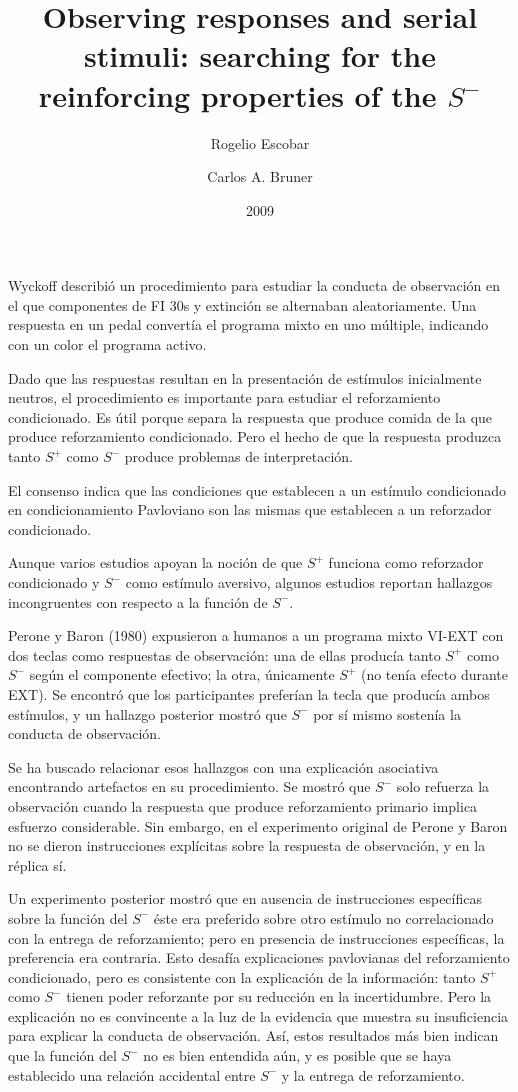 \documentclass[a4paper,12pt]{article}
\title{Observing responses and serial stimuli: searching for the reinforcing properties of the $S^{-}$}
\author{Rogelio Escobar \and Carlos A. Bruner}
\date{2009}
\begin{document}
{\scshape\bfseries \maketitle}

Wyckoff describió un procedimiento para estudiar la conducta de observación en el que componentes de FI 30s y extinción se alternaban aleatoriamente.
Una respuesta en un pedal convertía el programa mixto en uno múltiple, indicando con un color el programa activo.

Dado que las respuestas resultan en la presentación de estímulos inicialmente neutros, el procedimiento es importante para estudiar el reforzamiento condicionado.
Es útil porque separa la respuesta que produce comida de la que produce reforzamiento condicionado.
Pero el hecho de que la respuesta produzca tanto $S^{+}$ como $S^{-}$ produce problemas de interpretación.

El consenso indica que las condiciones que establecen a un estímulo condicionado en condicionamiento Pavloviano son las mismas que establecen a un reforzador condicionado.

Aunque varios estudios apoyan la noción de que $S^{+}$ funciona como reforzador condicionado y $S^{-}$ como estímulo aversivo, algunos estudios reportan hallazgos incongruentes con respecto a la función de $S^{-}$.

Perone y Baron (1980) expusieron a humanos a un programa mixto VI-EXT con dos teclas como respuestas de observación: una de ellas producía tanto $S^{+}$ como $S^{-}$ según el componente efectivo; la otra, únicamente $S^{+}$ (no tenía efecto durante EXT).
Se encontró que los participantes preferían la tecla que producía ambos estímulos, y un hallazgo posterior mostró que $S^{-}$ por sí mismo sostenía la conducta de observación.

Se ha buscado relacionar esos hallazgos con una explicación asociativa encontrando artefactos en su procedimiento.
Se mostró que $S^{-}$ solo refuerza la observación cuando la respuesta que produce reforzamiento primario implica esfuerzo considerable.
Sin embargo, en el experimento original de Perone y Baron no se dieron instrucciones explícitas sobre la respuesta de observación, y en la réplica sí.

Un experimento posterior mostró que en ausencia de instrucciones específicas sobre la función del $S^{-}$ éste era preferido sobre otro estímulo no correlacionado con la entrega de reforzamiento; pero en presencia de instrucciones específicas, la preferencia era contraria.
Esto desafía explicaciones pavlovianas del reforzamiento condicionado, pero es consistente con la explicación de la información: tanto $S^{+}$ como $S^{-}$ tienen poder reforzante por su reducción en la incertidumbre.
Pero la explicación no es convincente a la luz de la evidencia que muestra su insuficiencia para explicar la conducta de observación.
Así, estos resultados más bien indican que la función del $S^{-}$ no es bien entendida aún, y es posible que se haya establecido una relación accidental entre $S^{-}$ y la entrega de reforzamiento.
\end{document}
